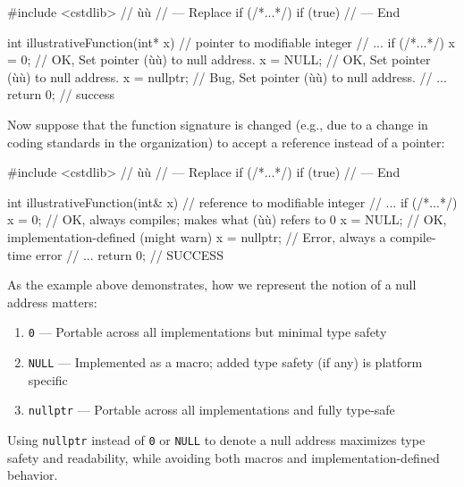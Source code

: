 \begin{emcppshiddenlisting}[emcppsbatch=e1]
#include <cstdlib>  // ù{}ù
// --- Replace
    if (/*...*/)
    if (true)
// --- End
\end{emcppshiddenlisting}
\begin{emcppslisting}[emcppsbatch=e1]
int illustrativeFunction(int* x)   // pointer to modifiable integer
{
    // ...
    if (/*...*/)
    {
        x = 0;       // OK, Set pointer (ù{}ù) to null address.
        x = NULL;    // OK, Set pointer (ù{}ù) to null address.
        x = nullptr; // Bug, Set pointer (ù{}ù) to null address.
    }
    // ...
    return 0;    // success
}
\end{emcppslisting}


Now suppose that the function signature is changed (e.g., due to a
change in coding standards in the organization) to accept a reference
instead of a pointer:

\begin{emcppshiddenlisting}[emcppsbatch=e2]
#include <cstdlib>  // ù{}ù
// --- Replace
    if (/*...*/)
    if (true)
// --- End
\end{emcppshiddenlisting}
\begin{emcppslisting}[emcppsbatch=e2]
int illustrativeFunction(int& x)  // reference to modifiable integer
{
    // ...
    if (/*...*/)
    {
        x = 0;       // OK, always compiles; makes what (ù{}ù) refers to 0
        x = NULL;    // OK, implementation-defined (might warn)
        x = nullptr; // Error, always a compile-time error
    }
    // ...
    return 0;    // SUCCESS
}
\end{emcppslisting}


As the example above demonstrates, how we represent the notion of a
null address matters:
\begin{enumerate}
\item{\lstinline!0! — Portable across all implementations but minimal type safety}
\item{\lstinline!NULL! — Implemented as a macro; added type safety (if any) is platform specific}
\item{\lstinline!nullptr! — Portable across all implementations and fully type-safe}
\end{enumerate}
Using \lstinline!nullptr! instead of \lstinline!0! or \lstinline!NULL! to denote
a null address maximizes type safety and readability, while avoiding
both macros and implementation-defined behavior.

